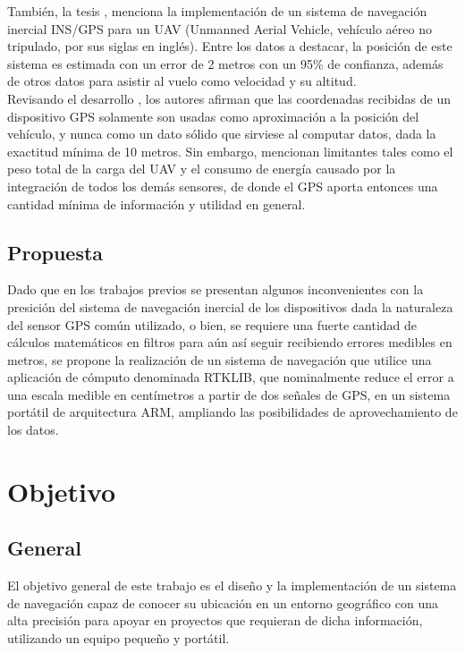 También, la tesis \cite{ronnback2000developement}, menciona la implementación de un sistema de navegación inercial INS/GPS para un UAV (Unmanned Aerial Vehicle, vehículo aéreo no tripulado, por sus siglas en inglés). Entre los datos a destacar, la posición de este sistema es estimada con un error de 2 metros con un 95\% de confianza, además de otros datos para asistir al vuelo como velocidad y su altitud. \\

Revisando el desarrollo \cite{maldonado2010controlador}, los autores afirman que las coordenadas recibidas de un dispositivo GPS solamente son usadas como aproximación a la posición del vehículo, y nunca como un dato sólido que sirviese al computar datos, dada la exactitud mínima de 10 metros. Sin embargo, mencionan limitantes tales como el peso total de la carga del UAV y el consumo de energía causado por la integración de todos los demás sensores, de donde el GPS aporta entonces una cantidad mínima de información y utilidad en general. \\


\subsection{Propuesta}
Dado que en los trabajos previos se presentan algunos inconvenientes con la presición del sistema de navegación inercial de los dispositivos dada la naturaleza del sensor GPS común utilizado, o bien, se requiere una fuerte cantidad de cálculos matemáticos en filtros para aún así seguir recibiendo errores medibles en metros, se propone la realización de un sistema de navegación que utilice una aplicación de cómputo denominada RTKLIB, que nominalmente reduce el error a una escala medible en centímetros a partir de dos señales de GPS, en un sistema portátil de arquitectura ARM, ampliando las posibilidades de aprovechamiento de los datos.

\section{Objetivo}
\subsection{General}
El objetivo general de este trabajo es el diseño y la implementación de un sistema de navegación capaz de conocer su ubicación en un entorno geográfico con una alta precisión para apoyar en proyectos que requieran de dicha información, utilizando un equipo pequeño y portátil.

